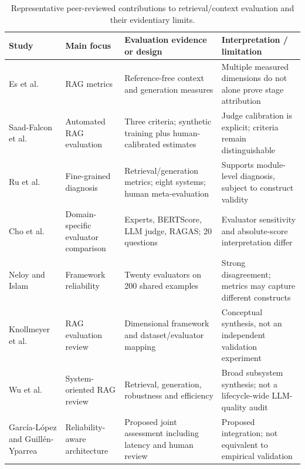 \begin{table}[t]
\centering
\footnotesize
\caption{Representative peer-reviewed contributions to retrieval/context evaluation and their evidentiary limits.}
\label{tab:context-quality-studies}
\begin{tabular}{p{} p{} p{} p{}}
\toprule
\textbf{Study} & \textbf{Main focus} & \textbf{Evaluation evidence or design} & \textbf{Interpretation / limitation} \\
\midrule
Es et al.\ \cite{es2024ragas} & RAG metrics & Reference-free context and generation measures & Multiple measured dimensions do not alone prove stage attribution \\
Saad-Falcon et al.\ \cite{saadfalcon2024ares} & Automated RAG evaluation & Three criteria; synthetic training plus human-calibrated estimates & Judge calibration is explicit; criteria remain distinguishable \\
Ru et al.\ \cite{ru2024ragchecker} & Fine-grained diagnosis & Retrieval/generation metrics; eight systems; human meta-evaluation & Supports module-level diagnosis, subject to construct validity \\
Cho et al.\ \cite{cho2026graphene} & Domain-specific evaluator comparison & Experts, BERTScore, LLM judge, RAGAS; 20 questions & Evaluator sensitivity and absolute-score interpretation differ \\
Neloy and Islam \cite{neloy2026metarag} & Framework reliability & Twenty evaluators on 200 shared examples & Strong disagreement; metrics may capture different constructs \\
Knollmeyer et al.\ \cite{knollmeyer2026rag} & RAG evaluation review & Dimensional framework and dataset/evaluator mapping & Conceptual synthesis, not an independent validation experiment \\
Wu et al.\ \cite{wu2026ragsurvey} & System-oriented RAG review & Retrieval, generation, robustness and efficiency & Broad subsystem synthesis; not a lifecycle-wide LLM-quality audit \\
García-López and Guillén-Yparrea \cite{garcialopez2026reliabilityrag} & Reliability-aware architecture & Proposed joint assessment including latency and human review & Proposed integration; not equivalent to empirical validation \\
\bottomrule
\end{tabular}
\end{table}

